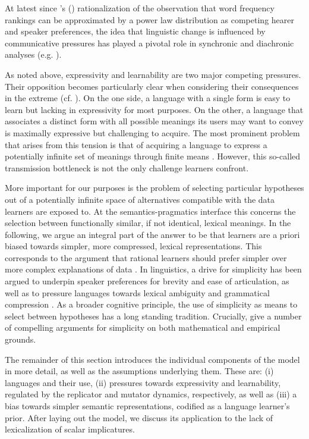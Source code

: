 \documentclass[a4paper]{article}
\newcommand{\citeposs}[2][]{\citeauthor{#2}'s (\citeyear[#1]{#2})}
\begin{document}
At latest since \citeposs{zipf:1949} rationalization of the observation that word frequency rankings can be approximated by a power law distribution as competing hearer and speaker preferences, the idea that linguistic change is influenced by communicative pressures has played a pivotal role in synchronic and diachronic analyses (e.g. \citealt{martinet:1962, horn:1984,jaeger+vRooij:2007,jaeger:2007, piantadosi:2014,kirby+etal:2015}). 

As noted above, expressivity and learnability are two major competing pressures. Their opposition becomes particularly clear when considering their consequences in the extreme (cf. \citealt{kemp+regier:2012,kirby+etal:2015}). On the one side, a language with a single form is easy to learn but lacking in expressivity for most purposes. On the other, a language that associates a distinct form with all possible meanings its users may want to convey is maximally expressive but challenging to acquire. The most prominent problem that arises from this tension is that of acquiring a language to express a potentially infinite set of meanings through finite means \citep{kirby:2002}. However, this so-called transmission bottleneck is not the only challenge learners confront. 

More important for our purposes is the problem of selecting particular hypotheses out of a potentially infinite space of alternatives compatible with the data learners are exposed to. At the semantics-pragmatics interface this concerns the selection between functionally similar, if not identical, lexical meanings.  In the following, we argue an integral part of the answer to be that learners are a priori biased towards simpler, more compressed, lexical representations. This corresponds to the argument that rational learners should prefer simpler over more complex explanations of data \citep{feldman:2000, chater+vitanyi:2003, piantadosi+etal:2012a, kirby+etal:2015,piantadosi+etal:underreview}. In linguistics, a drive for simplicity has been argued to underpin speaker preferences for brevity and ease of articulation, as well as to pressure languages towards lexical ambiguity and grammatical compression \citep{zipf:1949,grice:1975,piantadosi+etal:2012, kirby+etal:2015}. As a broader cognitive principle, the use of simplicity as means to select between hypotheses has a long standing tradition. Crucially, \citet{chater+vitanyi:2003} give a number of compelling arguments for simplicity on both mathematical and empirical grounds.


The remainder of this section introduces the individual components of the model in more detail, as well as the assumptions underlying them. These are: (i) languages and their use, (ii) pressures towards expressivity and learnability, regulated by the replicator and mutator dynamics, respectively, as well as (iii) a bias towards simpler semantic representations, codified as a language learner's prior. After laying out the model, we discuss its application to the lack of lexicalization of scalar implicatures.
\end{document}
